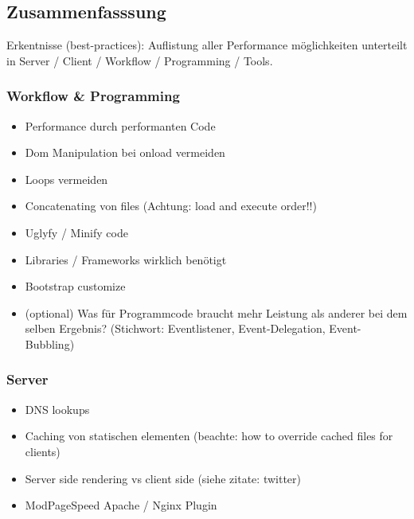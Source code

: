 \documentclass[a4paper,11pt,singlespacing]{article}
\begin{document}
	\subsection{Zusammenfasssung}
	\label{sub:zusammenfasssung}
		Erkentnisse (best-practices): Auflistung aller Performance möglichkeiten unterteilt in Server / Client / Workflow / Programming / Tools.\\

		\subsubsection{Workflow \& Programming} %
		\label{ssub:workflow_programming}
		\begin{itemize}
			\item Performance durch performanten Code
			\item Dom Manipulation bei onload vermeiden
			\item Loops vermeiden
			\item Concatenating von files (Achtung: load and execute order!!)
			\item Uglyfy / Minify code
			\item Libraries / Frameworks wirklich benötigt
			\item Bootstrap customize
			\item (optional) Was für Programmcode braucht mehr Leistung als anderer bei dem selben Ergebnis? (Stichwort: Eventlistener, Event-Delegation, Event-Bubbling)
		\end{itemize}
	

		\subsubsection{Server} %
		\label{ssub:server}
		\begin{itemize}
			\item DNS lookups
			\item Caching von statischen elementen (beachte: how to override cached files for clients)
			\item Server side rendering vs client side (siehe zitate: twitter)
			\item ModPageSpeed Apache / Nginx Plugin
		\end{itemize}	
		
\end{document}
